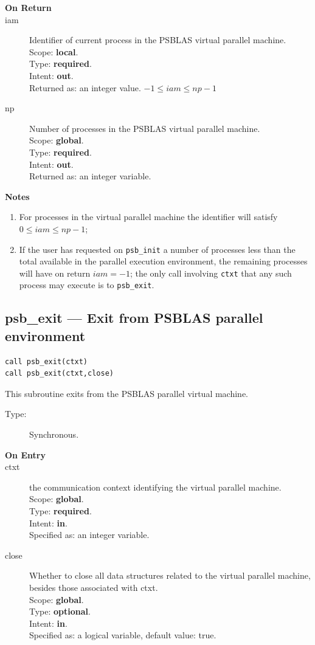 \begin{description}
\item[\bf On Return]
\item[iam] Identifier of current  process in the PSBLAS virtual parallel machine.\\
Scope: {\bf local}.\\
Type: {\bf required}.\\
Intent: {\bf out}.\\
Returned as: an integer value. $-1 \le iam \le np-1$\
\item[np] Number of processes in the PSBLAS virtual parallel machine.\\
Scope: {\bf global}.\\
Type: {\bf required}.\\
Intent: {\bf out}.\\
Returned as: an integer variable. \
\end{description}


{\par\noindent\large\bfseries Notes}
\begin{enumerate}
\item For processes in the virtual parallel machine  the identifier
  will satisfy $0 \le iam \le np-1$;
\item If the user has requested on \verb|psb_init| a number of
  processes less than the total available in the parallel execution
  environment, the remaining processes will have on return $iam=-1$;
  the only call involving \verb|ctxt| that any such process may
  execute is  to \verb|psb_exit|. 
\end{enumerate}


\clearpage\subsection{psb\_exit --- Exit from  PSBLAS parallel
  environment}

\begin{verbatim}
call psb_exit(ctxt)
call psb_exit(ctxt,close)
\end{verbatim}

This subroutine exits from the  PSBLAS parallel virtual  machine.
\begin{description}
\item[Type:] Synchronous.
\item[\bf  On Entry ]
\item[ctxt] the communication context identifying the virtual
  parallel machine.\\
Scope: {\bf global}.\\
Type: {\bf required}.\\
Intent: {\bf in}.\\
Specified as: an integer variable.
\item[close] Whether to close all data structures related to the
  virtual parallel machine, besides those associated with ctxt.\\
Scope: {\bf global}.\\
Type: {\bf optional}.\\
Intent: {\bf in}.\\
Specified as: a logical  variable, default value: true.
\end{description}

